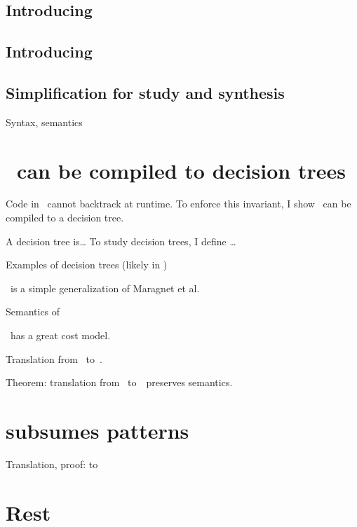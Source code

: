 \documentclass[manuscript,screen,review, 12pt, nonacm]{acmart}
\begin{document}
\begin{outline}[enumerate]
\subsection{Introducing \PPlus}

\subsection{Introducing \VMinus}

\subsection{Simplification for study and synthesis}

\1 \PPlus 
\1 \VMinus 
\1 Syntax, semantics 
\section{\VMinus\ can be compiled to decision trees}
Code in \VMinus\ cannot backtrack at runtime. To enforce this invariant, 
I show \VMinus\ can be compiled to a decision tree. 

A decision tree is\dots
To study decision trees, I define \D\dots

Examples of decision trees (likely in \D )

\D\ is a simple generalization of Maragnet et al. 

Semantics of \D 

\D\ has a great cost model. 

Translation from \VMinus\ to~\D. 

Theorem: translation from \VMinus\ to~\D\ preserves semantics. 

\section{\VMinus subsumes patterns}
\1 Translation, proof: \PPlus to \VMinus
\section{Rest}
\end{outline}

\end{document}
